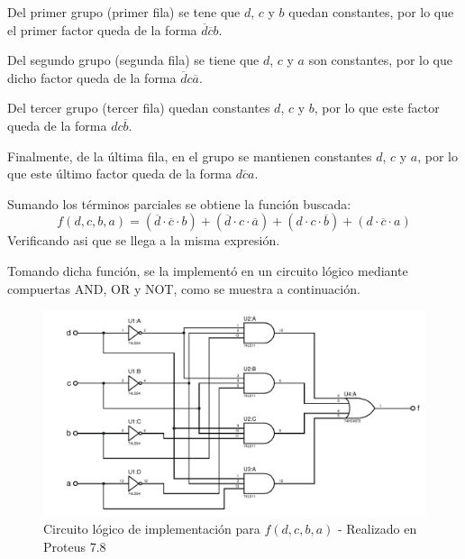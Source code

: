 \begin{centering}
    \begin{Karnaugh}
    \end{Karnaugh}
\par\end{centering}

Del primer grupo (primer fila) se tene que $d$, $c$ y $b$ quedan 
constantes, por lo que el primer factor queda de la forma 
$ \overline{d} \overline{c} b$.\par
Del segundo grupo (segunda fila) se tiene que $d$, $c$ y $a$ son 
constantes, por lo que dicho factor queda de la forma $ \overline{d} c \overline{a}$.\par
Del tercer grupo (tercer fila) quedan constantes $d$, $c$ y $b$, por lo 
que este factor queda de la forma $d c \overline{b}$.\par
Finalmente, de la última fila, en el grupo se mantienen constantes
$d$, $c$ y $a$, por lo que este último factor queda de la forma 
$d \overline{c} a$.\par
Sumando los términos parciales se obtiene la función buscada:
\[
    \boxed{f(d,c,b,a)=(\overline{d} \cdot \overline{c} \cdot b)+
    (\overline{d} \cdot c \cdot \overline{a})+
    (d \cdot c \cdot \overline{b})+  
    (d \cdot \overline{c} \cdot a)}     
\]
Verificando asi que se llega a la misma expresión.\par
Tomando dicha función, se la implementó en un circuito lógico mediante 
compuertas AND, OR y NOT, como se muestra a continuación.

\begin{figure}[H]
    \begin{centering}
    \includegraphics[width=1\textwidth]{ImplementacionEj2}
    \par\end{centering}
    \caption{Circuito lógico de implementación para $f(d,c,b,a)$ - Realizado en Proteus 7.8}
\end{figure}

